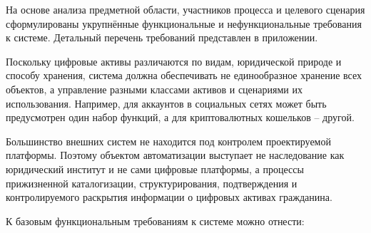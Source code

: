 
На основе анализа предметной области, участников процесса и целевого сценария сформулированы укрупнённые функциональные и нефункциональные требования к системе. Детальный перечень требований представлен в приложении.

Поскольку цифровые активы различаются по видам, юридической природе и способу хранения, система должна обеспечивать не единообразное хранение всех объектов, а управление разными классами активов и сценариями их использования. Например, для аккаунтов в социальных сетях может быть предусмотрен один набор функций, а для криптовалютных кошельков -- другой.

Большинство внешних систем не находится под контролем проектируемой платформы. Поэтому объектом автоматизации выступает не наследование как юридический институт и не сами цифровые платформы, а процессы прижизненной каталогизации, структурирования, подтверждения и контролируемого раскрытия информации о цифровых активах гражданина.

К базовым функциональным требованиям к системе можно отнести:

